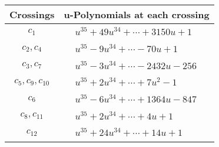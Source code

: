 \documentclass[1p]{elsarticle_modified}
\theoremstyle{definition}
\begin{document}
\begin{tabular}{m{50pt}|m{274pt}}
Crossings & \hspace{64pt}u-Polynomials at each crossing \\
\hline $$\begin{aligned}c_{1}\end{aligned}$$&$\begin{aligned}
&u^{35}+49 u^{34}+\cdots+3150 u+1
\end{aligned}$\\
\hline $$\begin{aligned}c_{2},c_{4}\end{aligned}$$&$\begin{aligned}
&u^{35}-9 u^{34}+\cdots-70 u+1
\end{aligned}$\\
\hline $$\begin{aligned}c_{3},c_{7}\end{aligned}$$&$\begin{aligned}
&u^{35}-3 u^{34}+\cdots-2432 u-256
\end{aligned}$\\
\hline $$\begin{aligned}c_{5},c_{9},c_{10}\end{aligned}$$&$\begin{aligned}
&u^{35}+2 u^{34}+\cdots+7 u^2-1
\end{aligned}$\\
\hline $$\begin{aligned}c_{6}\end{aligned}$$&$\begin{aligned}
&u^{35}-6 u^{34}+\cdots+1364 u-847
\end{aligned}$\\
\hline $$\begin{aligned}c_{8},c_{11}\end{aligned}$$&$\begin{aligned}
&u^{35}+2 u^{34}+\cdots+4 u+1
\end{aligned}$\\
\hline $$\begin{aligned}c_{12}\end{aligned}$$&$\begin{aligned}
&u^{35}+24 u^{34}+\cdots+14 u+1
\end{aligned}$\\
\hline
\end{tabular}\\~\\
\newpage\renewcommand{\arraystretch}{1}
\end{document}
